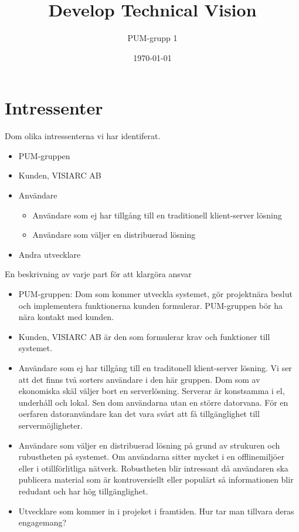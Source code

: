 

\ifpdf
\else
\fi

\title{Develop Technical Vision}
\author{PUM-grupp 1}
\date{\today}



\maketitle\thispagestyle{empty}
\newpage
\section{Intressenter}
Dom olika intressenterna vi har identiferat.
\begin{itemize}
\item PUM-gruppen
\item Kunden, VISIARC AB
\item Användare
\begin{itemize}
\item Användare som ej har tillgång till en traditionell klient-server lösning
\item Användare som väljer en distribuerad lösning
\end{itemize}
\item Andra utvecklare
\end{itemize}
En beskrivning av varje part för att klargöra ansvar  
\begin{itemize}
\item PUM-gruppen: Dom som kommer utveckla systemet, gör projektnära beslut och implementera funktionerna kunden formulerar.  PUM-gruppen bör ha nära kontakt med kunden.
\item Kunden, VISIARC AB är den som formulerar krav och funktioner till systemet. 
\item Användare som ej har tillgång till en traditonell klient-server lösning. Vi ser att det finns två sorters användare i den här gruppen. Dom som av ekonomiska skäl väljer bort en serverlösning. Serverar är konstsamma i el, underhåll och lokal. Sen dom användarna utan en större datorvana. För en oerfaren datoranvändare kan det vara svårt att få tillgänglighet till servermöjligheter. 
\item Användare som väljer en distribuerad lösning på grund av strukuren och rubustheten på systemet. Om användarna sitter mycket i en offlinemiljöer eller i otillförlitliga nätverk. Robustheten blir intressant då användaren ska publicera material som är kontroversiellt eller populärt så informationen blir redudant och har hög tillgänglighet.
\item Utvecklare som kommer in i projeket i framtiden. Hur tar man tillvara deras engagemang?
\end{itemize}
